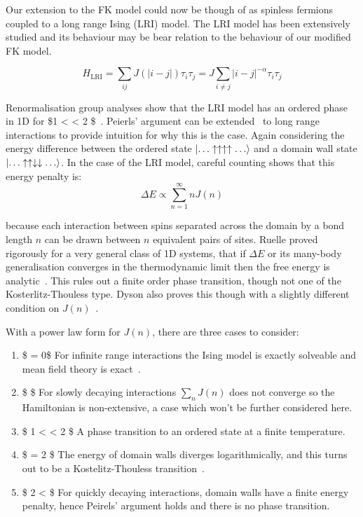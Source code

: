 Our extension to the FK model could now be though of as spinless fermions coupled to a long range Ising (LRI) model. The LRI model has been extensively studied and its behaviour may be bear relation to the behaviour of our modified FK model.

\[H_{\mathrm{LRI}} = \sum_{ij} J(|i-j|) \tau_i \tau_j = J \sum_{i\neq j} |i - j|^{-\alpha} \tau_i \tau_j\]

Renormalisation group analyses show that the LRI model has an ordered phase in 1D for \$1 \textless{} \alpha \textless{} 2 \$~\autocite{dysonExistencePhasetransitionOnedimensional1969}. Peierls' argument can be extended~\autocite{thoulessLongRangeOrderOneDimensional1969} to long range interactions to provide intuition for why this is the case. Again considering the energy difference between the ordered state \(\ket{\ldots\uparrow\uparrow\uparrow\uparrow\ldots}\) and a domain wall state \(\ket{\ldots\uparrow\uparrow\downarrow\downarrow\ldots}\). In the case of the LRI model, careful counting shows that this energy penalty is: \[\Delta E \propto \sum_{n=1}^{\infty} n J(n)\]

because each interaction between spins separated across the domain by a bond length \(n\) can be drawn between \(n\) equivalent pairs of sites. Ruelle proved rigorously for a very general class of 1D systems, that if \(\Delta E\) or its many-body generalisation converges in the thermodynamic limit then the free energy is analytic~\autocite{ruelleStatisticalMechanicsOnedimensional1968}. This rules out a finite order phase transition, though not one of the Kosterlitz-Thouless type. Dyson also proves this though with a slightly different condition on \(J(n)\)~\autocite{dysonExistencePhasetransitionOnedimensional1969}.

With a power law form for \(J(n)\), there are three cases to consider:

\begin{enumerate}
\def\labelenumi{\arabic{enumi}.}
\tightlist
\item
  \$ \alpha = 0\$ For infinite range interactions the Ising model is exactly solveable and mean field theory is exact~\autocite{lipkinValidityManybodyApproximation1965}.
\item
  \$ \alpha {}\$ For slowly decaying interactions \(\sum_n J(n)\) does not converge so the Hamiltonian is non-extensive, a case which won't be further considered here.
\item
  \$ 1 \textless{} \alpha \textless{} 2 \$ A phase transition to an ordered state at a finite temperature.
\item
  \$ \alpha = 2 \$ The energy of domain walls diverges logarithmically, and this turns out to be a Kostelitz-Thouless transition~\autocite{thoulessLongRangeOrderOneDimensional1969}.
\item
  \$ 2 \textless{} \alpha \$ For quickly decaying interactions, domain walls have a finite energy penalty, hence Peirels' argument holds and there is no phase transition.
\end{enumerate}

